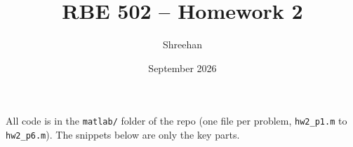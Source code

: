 \documentclass[11pt]{article}
\title{RBE 502 -- Homework 2}
\author{Shreehan}
\date{September 2026}
\begin{document}
\maketitle

All code is in the \texttt{matlab/} folder of the repo (one file per problem, \texttt{hw2\_p1.m} to \texttt{hw2\_p6.m}). The snippets below are only the key parts.







\end{document}
